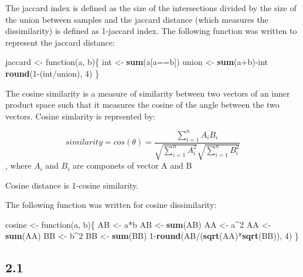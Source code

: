 \documentclass[]{article}
\newenvironment{Shaded}{\begin{snugshade}}{\end{snugshade}}
\newcommand{\KeywordTok}[1]{\textcolor[rgb]{0.13,0.29,0.53}{\textbf{{#1}}}}
\newcommand{\DecValTok}[1]{\textcolor[rgb]{0.00,0.00,0.81}{{#1}}}
\newcommand{\StringTok}[1]{\textcolor[rgb]{0.31,0.60,0.02}{{#1}}}
\newcommand{\NormalTok}[1]{{#1}}
\begin{document}
The jaccard index is defined as the size of the intersections divided by
the size of the union between samples and the jaccard distance (which
measures the dissimilarity) is defined as 1-jaccard index. The following
function was written to represent the jaccard distance:

\begin{Shaded}
\begin{Highlighting}[]
\NormalTok{jaccard <-}\StringTok{ }\NormalTok{function(a, b)\{ }
        \NormalTok{int <-}\StringTok{ }\KeywordTok{sum}\NormalTok{(a[a==b])}
        \NormalTok{union <-}\StringTok{ }\KeywordTok{sum}\NormalTok{(a+b)-int }
        \KeywordTok{round}\NormalTok{(}\DecValTok{1}\NormalTok{-(int/union), }\DecValTok{4}\NormalTok{)}
\NormalTok{\}}
\end{Highlighting}
\end{Shaded}

The cosine similarity is a measure of similarity between two vectors of
an inner product space such that it measures the cosine of the angle
between the two vectors. Cosine simlarity is reprsented by:

\[similarity = cos(\theta) = \frac{\sum^{n}_{i=1}A_{i}B_{i}}{\sqrt{\sum^{n}_{i=1}A^{2}_{i}}\sqrt{\sum^{n}_{i=1}B^{2}_{i}}} \],
where \(A_{i}\) and \(B_{i}\) are componets of vector A and B

Cosine distance is 1-cosine similarity.

The following function was written for cosine dissimilarity:

\begin{Shaded}
\begin{Highlighting}[]
\NormalTok{cosine <-}\StringTok{ }\NormalTok{function(a, b)\{}
        \NormalTok{AB <-}\StringTok{ }\NormalTok{a*b}
        \NormalTok{AB <-}\StringTok{ }\KeywordTok{sum}\NormalTok{(AB)}
        \NormalTok{AA <-}\StringTok{ }\NormalTok{a^}\DecValTok{2}
        \NormalTok{AA <-}\StringTok{ }\KeywordTok{sum}\NormalTok{(AA)}
        \NormalTok{BB <-}\StringTok{ }\NormalTok{b^}\DecValTok{2}
        \NormalTok{BB <-}\StringTok{ }\KeywordTok{sum}\NormalTok{(BB)}
        \DecValTok{1}\NormalTok{-}\KeywordTok{round}\NormalTok{(AB/(}\KeywordTok{sqrt}\NormalTok{(AA)*}\KeywordTok{sqrt}\NormalTok{(BB)), }\DecValTok{4}\NormalTok{)}
\NormalTok{\}}
\end{Highlighting}
\end{Shaded}

\subsection{2.1}\label{section}
\end{document}
